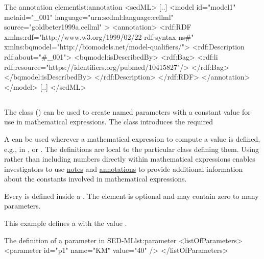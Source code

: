 \begin{myXmlLst}{The annotation element}{lst:annotation}
<sedML>
	[..]
	<model id="model1" metaid="_001" language="urn:sedml:language:cellml" source="goldbeter1999a.cellml" >
		<annotation>
    		<rdf:RDF xmlns:rdf="http://www.w3.org/1999/02/22-rdf-syntax-ns#" xmlns:bqmodel="http://biomodels.net/model-qualifiers/">
				<rdf:Description rdf:about="#_001">
				<bqmodel:isDescribedBy>
				<rdf:Bag>
					<rdf:li rdf:resource="https://identifiers.org/pubmed/10415827"/>
				</rdf:Bag>
				</bqmodel:isDescribedBy>
    			</rdf:Description>
			</rdf:RDF>
		</annotation>
	</model>
	[..]
</sedML>
\end{myXmlLst}


\subsection{}
\label{class:parameter}
The  class () can be used to create named parameters with a constant value for use in mathematical expressions.
The  class introduces the required 


A \Parameter can be used wherever a mathematical expression to compute a value is defined, e.g., in \ComputeChange, \FunctionalRange or \DataGenerator. The \Parameter definitions are local to the particular class defining them. Using  rather than including numbers directly within mathematical expressions enables investigators to use \hyperref[class:notes]{notes} and \hyperref[class:annotation]{annotations} to provide additional information about the constants involved in mathematical expressions.

Every \Parameter is defined inside a \ListOfParameters.  The element is optional and may contain zero to many parameters.

This example defines a   with the value . 
\begin{myXmlLst}{The definition of a parameter in SED-ML}{lst:parameter}
<listOfParameters>
	<parameter id="p1" name="KM" value="40" />
</listOfParameters>
\end{myXmlLst}


